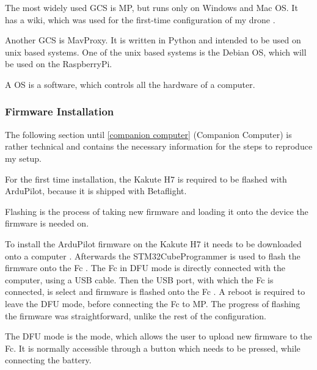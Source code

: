 \documentclass[svgnames]{article}
\begin{document}
	The most widely used \gls{GCS} is \gls{MP}, but runs only on Windows and Mac OS. It has a wiki, which was used for the first-time configuration of my drone \cite{MissionPlanner}. 
	
	Another \gls{GCS} is MavProxy. It is written in Python and intended to be used on unix based systems. One of the unix based systems is the Debian \gls{OS}, which will be used on the RaspberryPi.
	\begin{Explanation}
		\item A \gls{OS} is a software, which controls all the hardware of a computer.
	\end{Explanation}

	\subsubsection{Firmware Installation}
	The following section until \cref{companion computer} (Companion Computer) is rather technical and contains the necessary information for the steps to reproduce my setup.
	
	For the first time installation, the Kakute H7 is required to be flashed with ArduPilot, because it is shipped with Betaflight. 
	\begin{Explanation}[to flash]
		\item Flashing is the process of taking new firmware and loading it onto the device the firmware is needed on.
	\end{Explanation} 
	To install the ArduPilot firmware on the Kakute H7  it needs to be downloaded onto a computer \cite{ArduPilotFirmware}. Afterwards the STM32CubeProgrammer is used to flash the firmware onto the Fc \cite{STM32CubeProgrammer}. The \gls{Fc} in \gls{DFU} mode is directly connected with the computer, using a USB cable. Then the USB port, with which the \gls{Fc} is connected, is select and firmware is flashed onto the \gls{Fc} . A reboot is required to leave the \gls{DFU} mode, before connecting the \gls{Fc} to \gls{MP}. The progress of flashing the firmware was straightforward, unlike the rest of the configuration.

	
	\begin{Explanation}%
		\item The \gls{DFU} mode is the mode, which allows the user to upload new firmware to the \gls{Fc}. It is normally accessible through a button which needs to be pressed, while connecting the battery. 
	\end{Explanation}
\end{document}
